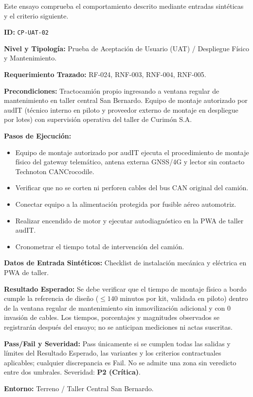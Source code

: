 Este ensayo comprueba el comportamiento descrito mediante entradas sintéticas y el criterio siguiente.

\par\noindent\textbf{ID:} \texttt{CP-\allowbreak{}UAT-\allowbreak{}02}\par
\par\noindent\textbf{Nivel y Tipología:} Prueba de Aceptación de Usuario (UAT) / Despliegue Físico y Mantenimiento.\par
\par\noindent\textbf{Requerimiento Trazado:} RF-024, RNF-003, RNF-004, RNF-005.\par
\par\noindent\textbf{Precondiciones:} Tractocamión propio ingresando a ventana regular de mantenimiento en taller central San Bernardo. Equipo de montaje autorizado por audIT (técnico interno en piloto y proveedor externo de montaje en despliegue por lotes) con supervisión operativa del taller de Curimón S.A.\par
\par\noindent\textbf{Pasos de Ejecución:}\par
\begin{itemize}
\item Equipo de montaje autorizado por audIT ejecuta el procedimiento de montaje físico del gateway telemático, antena externa GNSS/4G y lector sin contacto Technoton CANCrocodile.
\item Verificar que no se corten ni perforen cables del bus CAN original del camión.
\item Conectar equipo a la alimentación protegida por fusible aéreo automotriz.
\item Realizar encendido de motor y ejecutar autodiagnóstico en la PWA de taller audIT.
\item Cronometrar el tiempo total de intervención del camión.
\end{itemize}

\par\noindent\textbf{Datos de Entrada Sintéticos:} Checklist de instalación mecánica y eléctrica en PWA de taller.\par
\par\noindent\textbf{Resultado Esperado:} Se debe verificar que el tiempo de montaje físico a bordo cumple la referencia de diseño (\(\le 140\text{ minutos}\) por kit, validada en piloto) dentro de la ventana regular de mantenimiento sin inmovilización adicional y con 0 invasión de cables. Los tiempos, porcentajes y magnitudes observados se registrarán después del ensayo; no se anticipan mediciones ni actas suscritas.\par
\par\noindent\textbf{Pass/Fail y Severidad:} Pass únicamente si se cumplen todas las salidas y límites del Resultado Esperado, las variantes y los criterios contractuales aplicables; cualquier discrepancia es Fail. No se admite una zona sin veredicto entre dos umbrales. Severidad: \textbf{P2 (Crítica)}.\par
\par\noindent\textbf{Entorno:} Terreno / Taller Central San Bernardo.\par

